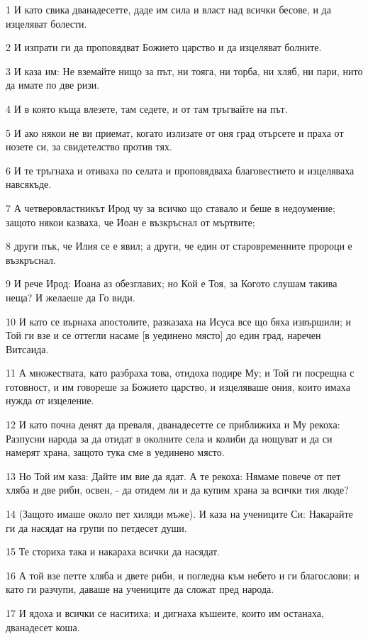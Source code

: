 \par 1 И като свика дванадесетте, даде им сила и власт над всички бесове, и да изцеляват болести.
\par 2 И изпрати ги да проповядват Божието царство и да изцеляват болните.
\par 3 И каза им: Не вземайте нищо за път, ни тояга, ни торба, ни хляб, ни пари, нито да имате по две ризи.
\par 4 И в която къща влезете, там седете, и от там тръгвайте на път.
\par 5 И ако някои не ви приемат, когато излизате от оня град отърсете и праха от нозете си, за свидетелство против тях.
\par 6 И те тръгнаха и отиваха по селата и проповядваха благовестието и изцеляваха навсякъде.
\par 7 А четверовластникът Ирод чу за всичко що ставало и беше в недоумение; защото някои казваха, че Иоан е възкръснал от мъртвите;
\par 8 други пък, че Илия се е явил; а други, че един от старовременните пророци е възкръснал.
\par 9 И рече Ирод: Иоана аз обезглавих; но Кой е Тоя, за Когото слушам такива неща? И желаеше да Го види.
\par 10 И като се върнаха апостолите, разказаха на Исуса все що бяха извършили; и Той ги взе и се оттегли насаме [в уединено място] до един град, наречен Витсаида.
\par 11 А множествата, като разбраха това, отидоха подире Му; и Той ги посрещна с готовност, и им говореше за Божието царство, и изцеляваше ония, които имаха нужда от изцеление.
\par 12 И като почна денят да преваля, дванадесетте се приближиха и Му рекоха: Разпусни народа за да отидат в околните села и колиби да нощуват и да си намерят храна, защото тука сме в уединено място.
\par 13 Но Той им каза: Дайте им вие да ядат. А те рекоха: Нямаме повече от пет хляба и две риби, освен, - да отидем ли и да купим храна за всички тия люде?
\par 14 (Защото имаше около пет хиляди мъже). И каза на учениците Си: Накарайте ги да насядат на групи по петдесет души.
\par 15 Те сториха така и накараха всички да насядат.
\par 16 А той взе петте хляба и двете риби, и погледна към небето и ги благослови; и като ги разчупи, даваше на учениците да сложат пред народа.
\par 17 И ядоха и всички се наситиха; и дигнаха къшеите, които им останаха, дванадесет коша.
